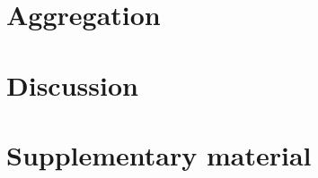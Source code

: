 \documentclass[11pt,a4paper]{report}      %
\begin{document}


\chapter{Aggregation}
\label{chap:AGG}




\chapter{Discussion}






%

\chapter*{Supplementary material}
\begin{appendices}
\renewcommand\pagenumbering[1]{}


%
\end{appendices}  
\end{document}

